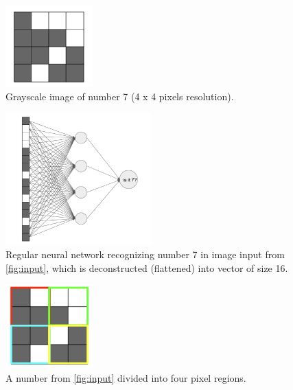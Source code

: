 \documentclass[11pt]{article}
\begin{document}
\begin{figure}[h]
\includegraphics[width=0.3\textwidth]{input}
\centering
\caption{Grayscale image of number 7 (4 x 4 pixels resolution).}
\label{fig:input}
\end{figure}

\begin{figure}[h]
\includegraphics[width=0.5\textwidth]{regular_net_image}
\centering
\caption{Regular neural network recognizing number 7 in image input from \autoref{fig:input}, which is deconstructed (flattened) into vector of size 16.}
\label{fig:regular_net_image}
\end{figure}

\begin{figure}[h]
\includegraphics[width=0.3\textwidth]{segmented_input}
\centering
\caption{A number from \autoref{fig:input} divided into four pixel regions.}
\label{fig:segmented_input}
\end{figure}
\end{document}
